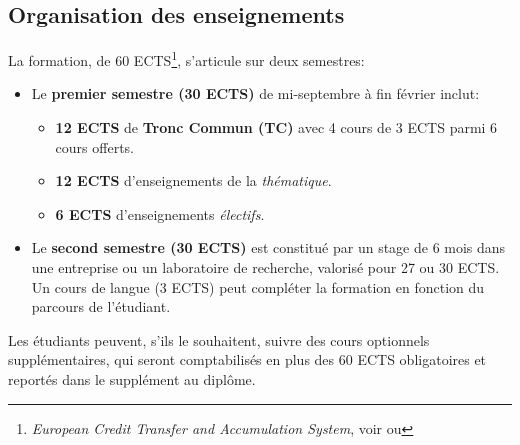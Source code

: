 \documentclass[french,11pt]{article}
\begin{document}
\subsection{Organisation des enseignements}

\noindent La formation, de 60 ECTS\footnote{\emph{European Credit Transfer and Accumulation System},  voir
 ou 
}, s'articule sur deux semestres:
\begin{itemize}
\item Le \textbf{premier semestre (30 ECTS)} de mi-septembre à fin février inclut:

\begin{itemize}
\item
\textbf{12 ECTS} de \textbf{Tronc Commun (TC)} avec  4 cours de 3 ECTS parmi 6 cours offerts.
\item
  \textbf{12 ECTS} d'enseignements de la \emph{thématique}.
\item
  \textbf{6 ECTS} d'enseignements \emph{électifs}.
\end{itemize}
\item Le \textbf{second semestre (30 ECTS)} est constitué par un stage de 6 mois dans
une entreprise ou un laboratoire de recherche, valorisé pour 27 ou 30
ECTS. Un cours de langue (3 ECTS) peut compléter la formation en fonction du parcours de l'étudiant.
\end{itemize}

Les étudiants peuvent, s'ils le souhaitent, suivre des cours optionnels supplémentaires, qui seront comptabilisés en plus des 60 ECTS obligatoires et reportés dans le supplément au diplôme.
\end{document}
